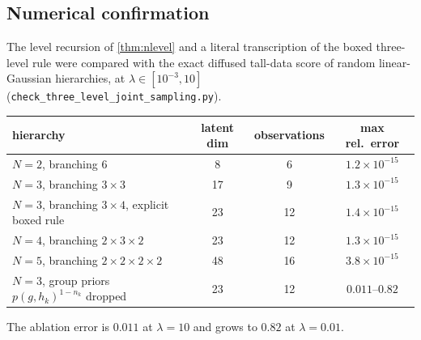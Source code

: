 \documentclass[11pt]{article}
\theoremstyle{definition}
\theoremstyle{remark}
\newcommand{\lam}{\lambda}
\newcommand{\hk}{h_k}
\begin{document}
\subsection{Numerical confirmation}
The level recursion of \cref{thm:nlevel} and a literal transcription of the boxed
three-level rule were compared with the exact diffused tall-data score of random
linear-Gaussian hierarchies, at $\lam\in[10^{-3},10]$
(\texttt{check\_three\_level\_joint\_sampling.py}).
\begin{center}\small
\begin{tabular}{@{}lccc@{}}
\toprule
hierarchy & latent dim & observations & max rel.\ error\\
\midrule
$N=2$, branching $6$ & 8 & 6 & $1.2\times10^{-15}$\\
$N=3$, branching $3\times3$ & 17 & 9 & $1.3\times10^{-15}$\\
$N=3$, branching $3\times4$, explicit boxed rule & 23 & 12 & $1.4\times10^{-15}$\\
$N=4$, branching $2\times3\times2$ & 23 & 12 & $1.3\times10^{-15}$\\
$N=5$, branching $2\times2\times2\times2$ & 48 & 16 & $3.8\times10^{-15}$\\
\midrule
$N=3$, group priors $p(g,\hk)^{1-n_k}$ dropped & 23 & 12 & $0.011$--$0.82$\\
\bottomrule
\end{tabular}
\end{center}
The ablation error is $0.011$ at $\lam=10$ and grows to $0.82$ at $\lam=0.01$.

\end{document}
